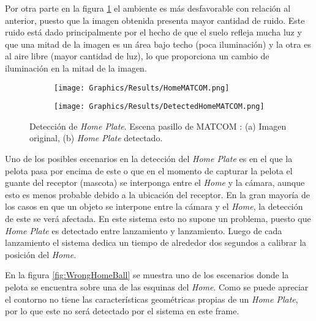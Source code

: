 Por otra parte en la figura \ref{fig:DetectedHomeMATCOM} el ambiente es más desfavorable con relación al anterior, puesto que la imagen obtenida presenta mayor cantidad de ruido. Este ruido está dado principalmente por el hecho de que el suelo refleja mucha luz y que una mitad de la imagen es un área bajo techo (poca iluminación) y la otra es al aire libre (mayor cantidad de luz), lo que proporciona un cambio de iluminación en la mitad de la imagen.

\begin{figure}[h!]
    \centering
    \begin{subfigure}[b]{0.32\linewidth}
        \texttt{[image: Graphics/Results/HomeMATCOM.png]}
        \caption{}
    \end{subfigure}
    \begin{subfigure}[b]{0.32\linewidth}
        \texttt{[image: Graphics/Results/DetectedHomeMATCOM.png]}
        \caption{}
    \end{subfigure}
    \caption{Detección de \textit{Home Plate}. Escena pasillo de MATCOM : (a) Imagen original, (b)\textit{ Home Plate} detectado.}
    \label{fig:DetectedHomeMATCOM}
\end{figure}

Uno de los posibles escenarios en la detección del \textit{Home Plate} es en el que la pelota pasa por encima de este o que en el momento de capturar la pelota el guante del receptor (mascota) se interponga entre el \textit{Home} y la cámara, aunque esto es menos probable debido a la ubicación del receptor. En la gran mayoría de los casos en que un objeto se interpone entre la cámara y el \textit{Home}, la detección de este se verá afectada. En este sistema esto no supone un problema, puesto que \textit{Home Plate} es detectado entre lanzamiento y lanzamiento. Luego de cada lanzamiento el sistema dedica un tiempo de alrededor dos segundos a calibrar la posición del \textit{Home}.

En la figura \ref{fig:WrongHomeBall} se muestra uno de los escenarios donde la pelota se encuentra sobre una de las esquinas del \textit{Home}. Como se puede apreciar el contorno no tiene las características geométricas propias de un \textit{Home Plate}, por lo que este no será detectado por el sistema en este frame.

